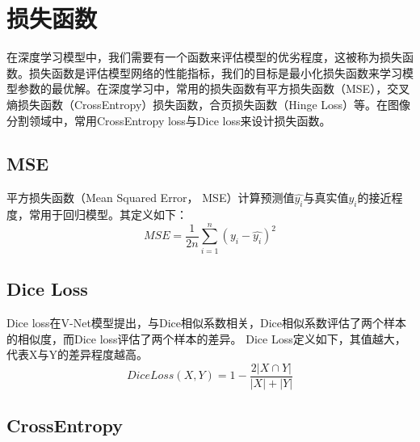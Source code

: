 \documentclass[AutoFakeBold]{LZUThesis}
\begin{document}
\section{损失函数}
在深度学习模型中，我们需要有一个函数来评估模型的优劣程度，这被称为损失函数。损失函数是评估模型网络的性能指标，我们的目标是最小化损失函数来学习模型参数的最优解。在深度学习中，常用的损失函数有平方损失函数（MSE），交叉熵损失函数（CrossEntropy）损失函数，合页损失函数（Hinge Loss）等。在图像分割领域中，常用CrossEntropy loss与Dice loss来设计损失函数。
\subsection{MSE}
平方损失函数（Mean Squared Error， MSE）计算预测值$\hat{y_i}$与真实值$y_i$的接近程度，常用于回归模型。其定义如下：
\begin{equation}
    MSE=\frac{1}{2n}\sum_{i=1}^n(y_i-\hat{y_i})^2
\end{equation}
\subsection{Dice Loss}
Dice loss在V-Net\textsuperscript{\cite{milletari2016v}}模型提出，与Dice相似系数相关，Dice相似系数评估了两个样本的相似度，而Dice loss评估了两个样本的差异。
Dice Loss定义如下，其值越大，代表X与Y的差异程度越高。
\begin{equation}
    DiceLoss(X, Y)=1-\frac{2|X\cap Y|}{|X|+|Y|}
\end{equation}



\subsection{CrossEntropy}
\end{document}
